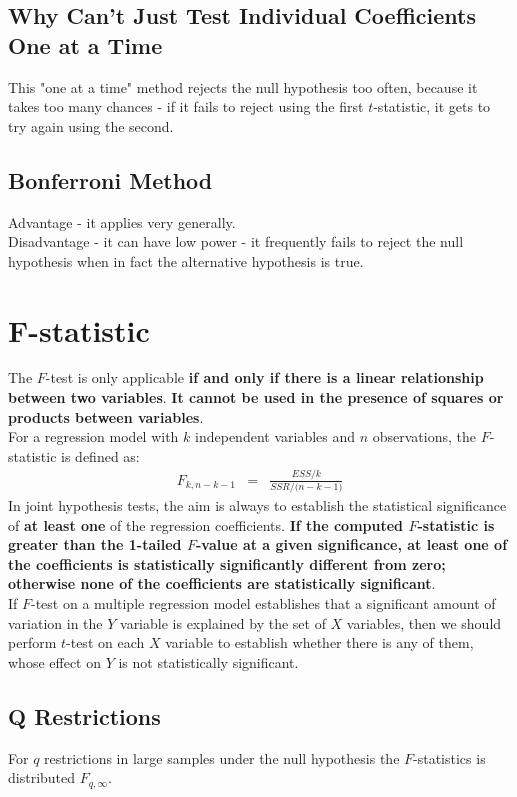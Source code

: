 \subsection{Why Can't Just Test Individual Coefficients One at a Time}
This "one at a time" method rejects the null hypothesis too often, because it takes too many chances -  if it fails to reject using the first $t$-statistic, it gets to try again using the second.

\subsection{Bonferroni Method}
Advantage - it applies very generally.\\
Disadvantage - it can have low power - it frequently fails to reject the null hypothesis when in fact the alternative hypothesis is true.

\section{F-statistic}
The $F$-test is only applicable \textbf{\color{ForestGreen}if and only if there is a linear relationship between two variables}. \textbf{\color{blue}It cannot be used in the presence of squares or products between variables}.\\ 
For a regression model with $k$ independent variables and $n$ observations, the $F$-statistic is defined as:
\begin{eqnarray}
	F_{k, n - k - 1} &=& \frac{ESS/k}{SSR/\big(n - k - 1\big)}
\end{eqnarray}
In joint hypothesis tests, the aim is always to establish the statistical significance of \textbf{\color{blue}at least one} of the regression coefficients. \textbf{\color{ForestGreen}If the computed $F$-statistic is greater than the 1-tailed $F$-value at a given significance, at least one of the coefficients is statistically significantly different from zero; \color{blue}otherwise none of the coefficients are statistically significant}.\\
If $F$-test on a multiple regression model establishes that a significant amount of variation in the $Y$ variable is explained by the set of $X$ variables, then we should perform $t$-test on each $X$ variable to establish whether there is any of them, whose effect on $Y$ is not statistically significant.


\subsection{Q Restrictions}
For $q$ restrictions in large samples under the null hypothesis the $F$-statistics is distributed $F_{q,\infty}$.

